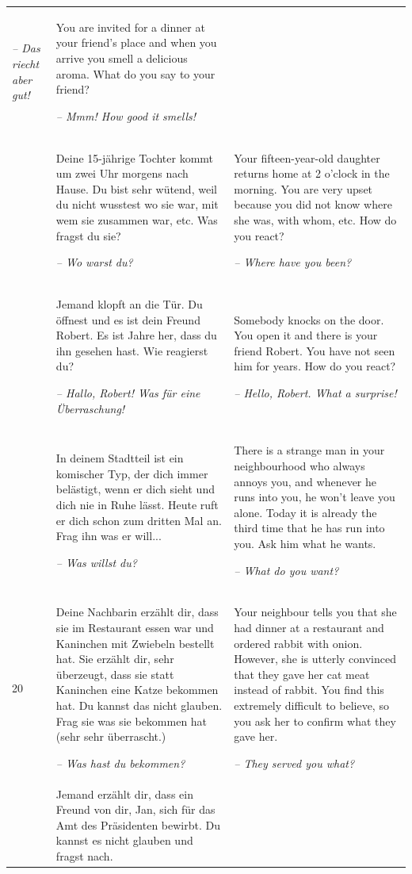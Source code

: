 \begin{xltabular}{\textwidth}{lQQ}
\textit{-- Das riecht aber gut!} & You are invited for a dinner at your friend’s place and when you arrive you smell a delicious aroma. What do you say to your friend?

{\itshape -- Mmm! How good it smells!}\\
 & Deine 15-jährige Tochter kommt um zwei Uhr morgens nach Hause. Du bist sehr wütend, weil du nicht wusstest wo sie war, mit wem sie zusammen war, etc. Was fragst du sie?

\textit{-- Wo warst du?} & Your fifteen-year-old daughter returns home at 2 o’clock in the morning. You are very upset because you did not know where she was, with whom, etc. How do you react?

{\itshape -- Where have you been?}\\
 & Jemand klopft an die Tür. Du öffnest und es ist dein Freund Robert. Es ist Jahre her, dass du ihn gesehen hast. Wie reagierst du?

\textit{-- Hallo, Robert! Was für eine Überraschung!} & Somebody knocks on the door. You open it and there is your friend Robert. You have not seen him for years. How do you react?

{\itshape -- Hello, Robert. What a surprise!}\\
 & In deinem Stadtteil ist ein komischer Typ, der dich immer belästigt, wenn er dich sieht und dich nie in Ruhe lässt. Heute ruft er dich schon zum dritten Mal an. Frag ihn was er will...

\textit{-- Was willst du?} & There is a strange man in your neighbourhood who always annoys you, and whenever he runs into you, he won’t leave you alone. Today it is already the third time that he has run into you. Ask him what he wants.

{\itshape -- What do you want?}\\
20 & Deine Nachbarin erzählt dir, dass sie im Restaurant essen war und Kaninchen mit Zwiebeln bestellt hat. Sie erzählt dir, sehr überzeugt, dass sie statt Kaninchen eine Katze bekommen hat. Du kannst das nicht glauben. Frag sie was sie bekommen hat (sehr sehr überrascht.)

\textit{-- Was hast du bekommen?} & Your neighbour tells you that she had dinner at a restaurant and ordered rabbit with onion. However, she is utterly convinced that they gave her cat meat instead of rabbit. You find this extremely difficult to believe, so you ask her to confirm what they gave her.

{\itshape -- They served you what?}\\
 & Jemand erzählt dir, dass ein Freund von dir, Jan, sich für das Amt des Präsidenten bewirbt. Du kannst es nicht glauben und fragst nach.


\end{xltabular}

